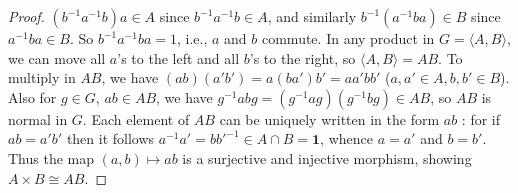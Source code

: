 \documentclass[a4paper,11pt]{amsart}
\theoremstyle{definition}
\newcommand{\1}{{\mathbf 1}}
\begin{document}
  \begin{proof} $(b^{-1}a^{-1}b)a \in A$ since $b^{-1}a^{-1}b\in A$, and similarly $b^{-1}(a^{-1}ba)\in B$ since $a^{-1}ba \in B$. So $b^{-1}a^{-1}ba=1$, i.e., $a$ and $b$ commute. In any product in $G=\langle A, B \rangle$, we can move all $a$'s to the left and all $b$'s to the right, so $\langle A, B\rangle=AB$. To multiply in $AB$, we
  have $(ab)(a'b')=a(ba')b'=aa'bb'$ ($a,a'\in A, b, b'\in B$).   Also for $g\in G$, $ab\in AB$, we have  $g^{-1}abg=(g^{-1}ag)(g^{-1}bg)\in AB$, so $AB$ is normal in $G$.
  Each element of $AB$ can be uniquely written in
  the form $ab$ : for if $ab=a'b'$  then it follows $a^{-1}a'=bb'^{-1}\in A\cap B=\1$, whence $a=a'$ and $b=b'$.
  Thus the map  $(a,b)\mapsto ab$ is a surjective and injective morphism, showing  $A\times B\cong AB$. 
 \end{proof}
 
\end{document}
